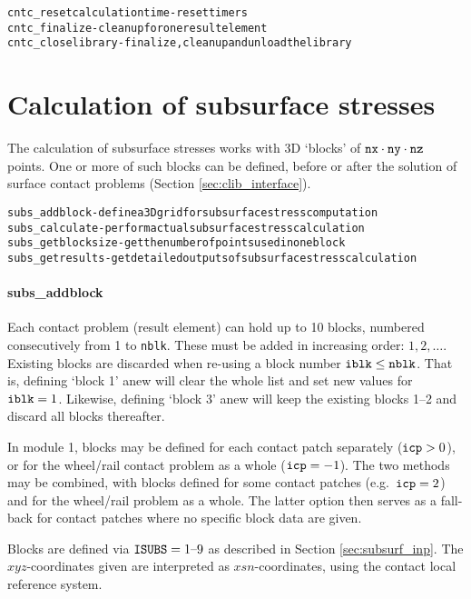 \documentclass[12pt]{report}
\begin{document}
\begin{alltt}\small
cntc_resetcalculationtime  - reset timers
cntc_finalize              - cleanup for one result element
cntc_closelibrary          - finalize, cleanup and unload the library
\end{alltt}

\section{Calculation of subsurface stresses}
\label{sec:clib_subs}

The calculation of subsurface stresses works with 3D `blocks' of ${\tt
nx}\cdot {\tt ny}\cdot {\tt nz}$ points. One or more of such blocks can
be defined, before or after the solution of surface contact problems
(Section \ref{sec:clib_interface}).

\begin{alltt}\small
subs_addblock      - define a 3D grid for subsurface stress computation
subs_calculate     - perform actual subsurface stress calculation
subs_getblocksize  - get the number of points used in one block
subs_getresults    - get detailed outputs of subsurface stress calculation
\end{alltt}

\paragraph{subs\_addblock}

Each contact problem (result element) can hold up to 10 blocks, numbered
consecutively from 1 to {\tt nblk}. These must be added in increasing
order: $1, 2, \ldots$. Existing blocks are discarded when re-using a
block number ${\tt iblk}\le {\tt nblk}$. That is, defining
`block 1' anew will clear the whole list and set new values for
${\tt iblk}=1$. Likewise, defining `block 3' anew will keep the
existing blocks 1--2 and discard all blocks thereafter.

In module 1, blocks may be defined for each contact patch separately (${\tt
icp}>0$), or for the wheel/rail contact problem as a whole (${\tt icp}=-1$).
The two methods may be combined, with blocks defined for some contact
patches (e.g.\ ${\tt icp}=2$) and for the wheel/rail problem as a whole.
The latter option then serves as a fall-back for contact patches
where no specific block data are given.

Blocks are defined via ${\tt ISUBS}=1\text{--}9$ as described in Section
\ref{sec:subsurf_inp}. The $xyz$-coordinates given are interpreted as
$xsn$-coordinates, using the contact local reference system.
\end{document}
